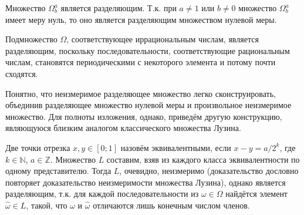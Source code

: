 \begin{corollary}
	Множество $\Omega^a_b$ является разделяющим.
	Т.к. при $a\neq 1$ или $b\neq 0$ множество $\Omega^a_b$ имеет меру нуль,
	то оно является разделяющим множеством нулевой меры.
\end{corollary}


\begin{remark}
	Подмножество $\Omega$, соответствующее иррациональным числам, является разделяющим,
	поскольку последовательности, соответствующие рациональным числам,
	становятся периодическими с некоторого элемента и потому почти сходятся.
\end{remark}


\begin{remark}
	Понятно, что неизмеримое разделяющее множество легко сконструировать,
	объединив разделяющее множество нулевой меры и произвольное неизмеримое множество.
	Для полноты изложения, однако, приведём другую конструкцию, являющуюся близким аналогом классического множества Лузина.

	Две точки отрезка $x,y \in [0;1]$ назовём эквивалентными, если
	$x - y = a/2^k$, где $k\in\mathbb{N}$, $a\in\mathbb{Z}$.
	Множество $L$ составим, взяв из каждого класса эквивалентности по одному представителю.
	Тогда $L$, очевидно, неизмеримо (доказательство дословно повторяет доказательство неизмеримости множества Лузина),
	однако является разделяющим, т.к. для каждой последовательности из $\omega\in\Omega$
	найдётся элемент $\hat\omega\in L$, такой, что $\omega$ и $\hat\omega$ отличаются лишь конечным числом членов.
\end{remark}

